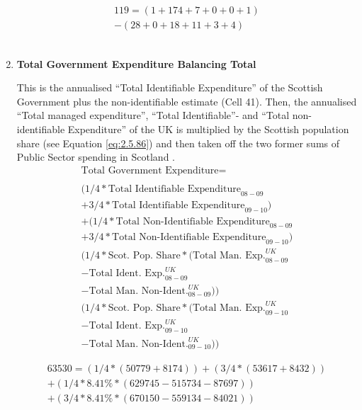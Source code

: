 \begin{enumerate}
\begin{equation} \nonumber
\begin{split}
119 = (1+174+7+0+0+1)\\
-(28+0+18+11+3+4)
\end{split}
\end{equation}\\


\item \textbf {Total Government Expenditure Balancing Total}

This is the annualised ``Total Identifiable Expenditure'' of the Scottish Government plus the non-identifiable estimate (Cell 41). Then, the annualised ``Total managed expenditure'', ``Total Identifiable''- and ``Total non-identifiable Expenditure'' of the UK is multiplied by the Scottish population share (see Equation \ref{eq:2.5.86}) and then taken off the two former sums of Public Sector spending in Scotland \cite{HMTR2012,ONS2011a}.\\

\begin{equation}
\begin{split}
\text{Total Government Expenditure} =  \\ \\
(1/4 * \text{Total Identifiable Expenditure}_{08-09} \\
+ 3/4 * \text{Total Identifiable Expenditure}_{09-10})\\
+ (1/4 * \text{Total Non-Identifiable Expenditure}_{08-09} \\
+ 3/4 * \text{Total Non-Identifiable Expenditure}_{09-10}) \\
( 1/4 * \text{Scot. Pop. Share} * ( \text{Total Man. Exp.}^{UK}_{08-09} \\
- \text{Total Ident. Exp.}^{UK}_{08-09} \\
- \text{Total Man. Non-Ident.}^{UK}_{08-09})) \\
( 1/4 * \text{Scot. Pop. Share} * ( \text{Total Man. Exp.}^{UK}_{09-10} \\
- \text{Total Ident. Exp.}^{UK}_{09-10} \\
- \text{Total Man. Non-Ident.}^{UK}_{09-10}))
\end{split} \label{eq:2.5.47}
\end{equation}


\begin{equation} \nonumber
\begin{split}
63530 = (1/4*(50779+8174))+(3/4*(53617+8432))\\
+(1/4*8.41\%*(629745-515734-87697))\\
+(3/4*8.41\%*(670150-559134-84021))
\end{split}
\end{equation}\\



\end{enumerate}
